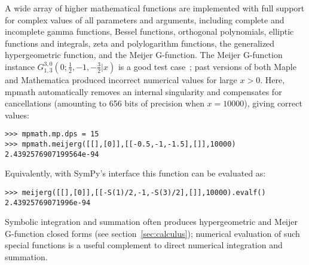 A wide array of higher mathematical functions are implemented
with full support for complex values of all parameters and arguments,
including complete and incomplete gamma functions,
Bessel functions, orthogonal polynomials, elliptic functions and integrals,
zeta and polylogarithm functions,
the generalized hypergeometric function, and the Meijer G-function.
The Meijer G-function instance
$G_{1, 3}^{3, 0}\left(0 ; \tfrac{1}{2}, -1, - \tfrac{3}{2} | x \right)$
is a good test case~\cite{Toth2007}; past versions of both Maple and
Mathematica produced incorrect numerical values for large $x > 0$.
Here, mpmath automatically removes an internal singularity
and compensates for cancellations (amounting to 656 bits
of precision when $x = 10000$), giving correct values:
\begin{verbatim}
>>> mpmath.mp.dps = 15
>>> mpmath.meijerg([[],[0]],[[-0.5,-1,-1.5],[]],10000)
2.4392576907199564e-94
\end{verbatim}

Equivalently, with SymPy's interface this function can be evaluated as:
\begin{verbatim}
>>> meijerg([[],[0]],[[-S(1)/2,-1,-S(3)/2],[]],10000).evalf()
2.43925769071996e-94
\end{verbatim}

Symbolic integration and summation often produces hypergeometric
and Meijer G-function closed forms (see section~\ref{sec:calculus});
numerical evaluation of such special functions is a useful complement
to direct numerical integration and summation.

